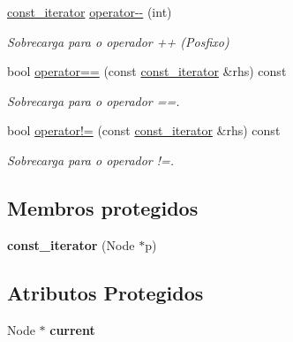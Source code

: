\begin{DoxyCompactItemize}
\item 
\hyperlink{class_list_1_1const__iterator}{const\+\_\+iterator} \hyperlink{class_list_1_1const__iterator_afc371e17d95507b573e9979767b9143d}{operator-\/-\/} (int)\hypertarget{class_list_1_1const__iterator_afc371e17d95507b573e9979767b9143d}{}\label{class_list_1_1const__iterator_afc371e17d95507b573e9979767b9143d}

\begin{DoxyCompactList}\small\item\em Sobrecarga para o operador ++ (Posfixo) \end{DoxyCompactList}\item 
bool \hyperlink{class_list_1_1const__iterator_ae8b8108b73e0cd8ea487d3d9c7d31e3b}{operator==} (const \hyperlink{class_list_1_1const__iterator}{const\+\_\+iterator} \&rhs) const \hypertarget{class_list_1_1const__iterator_ae8b8108b73e0cd8ea487d3d9c7d31e3b}{}\label{class_list_1_1const__iterator_ae8b8108b73e0cd8ea487d3d9c7d31e3b}

\begin{DoxyCompactList}\small\item\em Sobrecarga para o operador ==. \end{DoxyCompactList}\item 
bool \hyperlink{class_list_1_1const__iterator_af82ef9c2663c8cbe58404ac9c4c86bd3}{operator!=} (const \hyperlink{class_list_1_1const__iterator}{const\+\_\+iterator} \&rhs) const \hypertarget{class_list_1_1const__iterator_af82ef9c2663c8cbe58404ac9c4c86bd3}{}\label{class_list_1_1const__iterator_af82ef9c2663c8cbe58404ac9c4c86bd3}

\begin{DoxyCompactList}\small\item\em Sobrecarga para o operador !=. \end{DoxyCompactList}\end{DoxyCompactItemize}
\subsection*{Membros protegidos}
\begin{DoxyCompactItemize}
\item 
{\bfseries const\+\_\+iterator} (Node $\ast$p)\hypertarget{class_list_1_1const__iterator_a1dac9ee8bac44d9a4099b713fb8a1507}{}\label{class_list_1_1const__iterator_a1dac9ee8bac44d9a4099b713fb8a1507}

\end{DoxyCompactItemize}
\subsection*{Atributos Protegidos}
\begin{DoxyCompactItemize}
\item 
Node $\ast$ {\bfseries current}\hypertarget{class_list_1_1const__iterator_a8770ec36dd21c04484aa7918734d8e00}{}\label{class_list_1_1const__iterator_a8770ec36dd21c04484aa7918734d8e00}

\end{DoxyCompactItemize}
